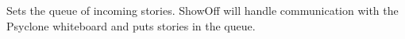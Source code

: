 
\begin{classmetadata}
\end{classmetadata}

\begin{interface}
    {Sets the queue of incoming stories. ShowOff will handle communication with
      the Psyclone whiteboard and puts stories in the queue.}
\end{interface}




\begin{classmetadata}
\end{classmetadata}

\begin{interface}
\end{interface}




\begin{classmetadata}
\end{classmetadata}

\begin{interface}
\end{interface}

